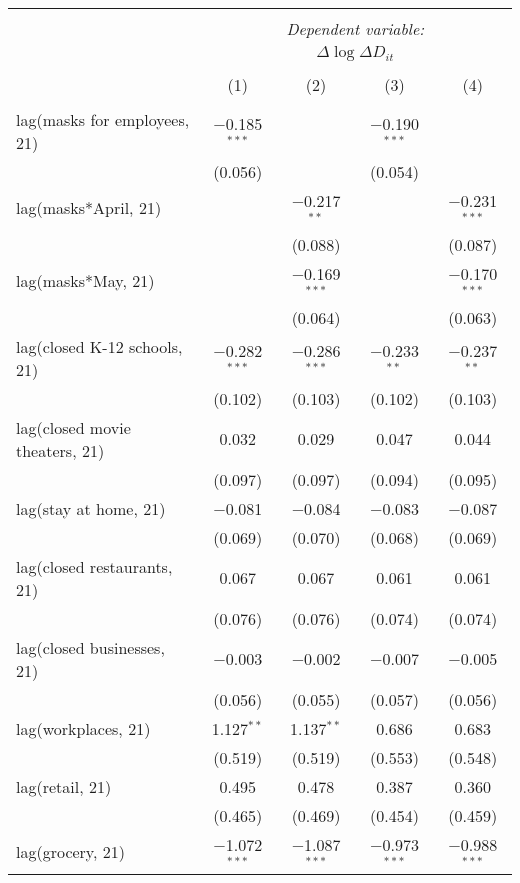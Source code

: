 \begin{tabular}{@{\extracolsep{1pt}}lcccc} 
\\[-1.8ex]\hline 
\hline \\[-1.8ex] 
 & \multicolumn{4}{c}{\textit{Dependent variable:}} \\ 
\cline{2-5} 
 & \multicolumn{4}{c}{$\Delta \log \Delta D_{it}$} \\ 
\\[-1.8ex] & (1) & (2) & (3) & (4)\\ 
\hline \\[-1.8ex] 
 lag(masks for employees, 21) & $-$0.185$^{***}$ &  & $-$0.190$^{***}$ &  \\ 
  & (0.056) &  & (0.054) &  \\ 
  lag(masks*April, 21) &  & $-$0.217$^{**}$ &  & $-$0.231$^{***}$ \\ 
  &  & (0.088) &  & (0.087) \\ 
  lag(masks*May, 21) &  & $-$0.169$^{***}$ &  & $-$0.170$^{***}$ \\ 
  &  & (0.064) &  & (0.063) \\ 
  lag(closed K-12 schools, 21) & $-$0.282$^{***}$ & $-$0.286$^{***}$ & $-$0.233$^{**}$ & $-$0.237$^{**}$ \\ 
  & (0.102) & (0.103) & (0.102) & (0.103) \\ 
  lag(closed movie theaters, 21) & 0.032 & 0.029 & 0.047 & 0.044 \\ 
  & (0.097) & (0.097) & (0.094) & (0.095) \\ 
  lag(stay at home, 21) & $-$0.081 & $-$0.084 & $-$0.083 & $-$0.087 \\ 
  & (0.069) & (0.070) & (0.068) & (0.069) \\ 
  lag(closed restaurants, 21) & 0.067 & 0.067 & 0.061 & 0.061 \\ 
  & (0.076) & (0.076) & (0.074) & (0.074) \\ 
  lag(closed businesses, 21) & $-$0.003 & $-$0.002 & $-$0.007 & $-$0.005 \\ 
  & (0.056) & (0.055) & (0.057) & (0.056) \\ 
  lag(workplaces, 21) & 1.127$^{**}$ & 1.137$^{**}$ & 0.686 & 0.683 \\ 
  & (0.519) & (0.519) & (0.553) & (0.548) \\ 
  lag(retail, 21) & 0.495 & 0.478 & 0.387 & 0.360 \\ 
  & (0.465) & (0.469) & (0.454) & (0.459) \\ 
  lag(grocery, 21) & $-$1.072$^{***}$ & $-$1.087$^{***}$ & $-$0.973$^{***}$ & $-$0.988$^{***}$ \\ 

\end{tabular}
